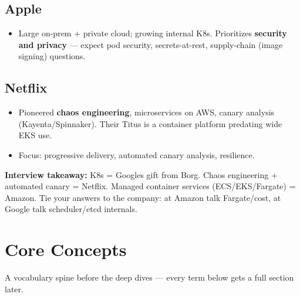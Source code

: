 \documentclass[11pt]{article}
\providecommand{\tightlist}{\setlength{\itemsep}{1pt}\setlength{\parskip}{0pt}}
\begin{document}
\subsection{Apple}\label{apple}

\begin{itemize}
\tightlist
\item
  Large on-prem + private cloud; growing internal K8s. Prioritizes \textbf{security and privacy} --- expect pod security, secrets-at-rest, supply-chain (image signing) questions.
\end{itemize}

\subsection{Netflix}\label{netflix}

\begin{itemize}
\tightlist
\item
  Pioneered \textbf{chaos engineering}, microservices on AWS, canary analysis (Kayenta/Spinnaker). Their Titus is a container platform predating wide EKS use.
\item
  Focus: progressive delivery, automated canary analysis, resilience.
\end{itemize}

\textbf{Interview takeaway:} K8s = Google\textquotesingle s gift from Borg. Chaos engineering + automated canary = Netflix. Managed container services (ECS/EKS/Fargate) = Amazon. Tie your answers to the company: at Amazon talk Fargate/cost, at Google talk scheduler/etcd internals.

\section{Core Concepts}\label{core-concepts}

A vocabulary spine before the deep dives --- every term below gets a full section later.
\end{document}
